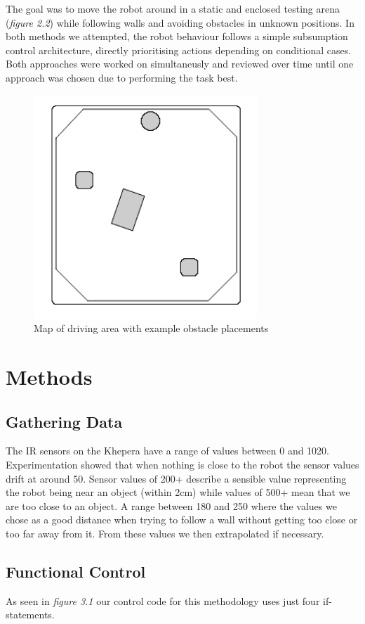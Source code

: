 \documentclass[paper=a4, fontsize=12pt]{scrartcl}	%
\numberwithin{equation}{section}		%
\numberwithin{figure}{section}			%
\numberwithin{table}{section}				%
\begin{document}
The goal was to move the robot around in a static and enclosed testing arena (\emph{figure 2.2}) while following walls and avoiding obstacles in unknown positions. In both methods we attempted, the robot behaviour follows a simple subsumption control architecture, directly prioritising actions depending on conditional cases. Both approaches were worked on simultaneusly and reviewed over time until one approach was chosen due to performing the task best.
\begin{figure}[!ht]
 \centering
  \includegraphics[width=0.75\textwidth]{mapexample}
  \caption{Map of driving area with example obstacle placements}
\end{figure}

\section{Methods}
\subsection{Gathering Data}
The IR sensors on the Khepera have a range of values between 0 and 1020. Experimentation showed that when nothing is close to the robot the sensor values drift at around 50. Sensor values of 200+ describe a sensible value representing the robot being near an object (within 2cm) while values of 500+ mean that we are too close to an object. A range between 180 and 250 where the values we chose as a good distance when trying to follow a wall without getting too close or too far away from it. From these values we then extrapolated if necessary.
\subsection{Functional Control}
As seen in \emph{figure 3.1} our control code for this methodology uses just four if-statements.
\end{document}
